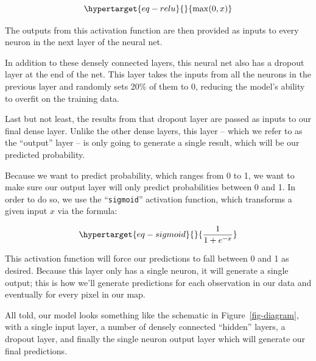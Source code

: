 \documentclass[
  letterpaper,
  DIV=11,
  numbers=noendperiod]{scrartcl}
\begin{document}
\begin{equation}\protect\hypertarget{eq-relu}{}{
\max(0, x)
}\label{eq-relu}\end{equation}

The outputs from this activation function are then provided as inputs to
every neuron in the next layer of the neural net.

In addition to these densely connected layers, this neural net also has
a dropout layer at the end of the net. This layer takes the inputs from
all the neurons in the previous layer and randomly sets 20\% of them to
0, reducing the model's ability to overfit on the training data.

Last but not least, the results from that dropout layer are passed as
inputs to our final dense layer. Unlike the other dense layers, this
layer -- which we refer to as the ``output'' layer -- is only going to
generate a single result, which will be our predicted probability.

Because we want to predict probability, which ranges from 0 to 1, we
want to make sure our output layer will only predict probabilities
between 0 and 1. In order to do so, we use the ``\texttt{sigmoid}''
activation function, which transforms a given input \(x\) via the
formula:

\begin{equation}\protect\hypertarget{eq-sigmoid}{}{
\frac{1}{1 + e^{-x}}
}\label{eq-sigmoid}\end{equation}

This activation function will force our predictions to fall between 0
and 1 as desired. Because this layer only has a single neuron, it will
generate a single output; this is how we'll generate predictions for
each observation in our data and eventually for every pixel in our map.

All told, our model looks something like the schematic in
Figure~\ref{fig-diagram}, with a single input layer, a number of densely
connected ``hidden'' layers, a dropout layer, and finally the single
neuron output layer which will generate our final predictions.
\end{document}
